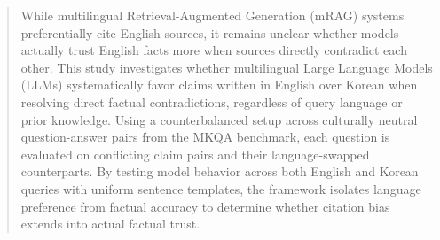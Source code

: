 \begin{abstract}

While multilingual Retrieval-Augmented Generation (mRAG) systems preferentially cite English sources, it remains unclear whether models actually trust English facts more when sources directly contradict each other. This study investigates whether multilingual Large Language Models (LLMs) systematically favor claims written in English over Korean when resolving direct factual contradictions, regardless of query language or prior knowledge. Using a counterbalanced setup across culturally neutral question-answer pairs from the MKQA benchmark, each question is evaluated on conflicting claim pairs and their language-swapped counterparts. By testing model behavior across both English and Korean queries with uniform sentence templates, the framework isolates language preference from factual accuracy to determine whether citation bias extends into actual factual trust.

\end{abstract}